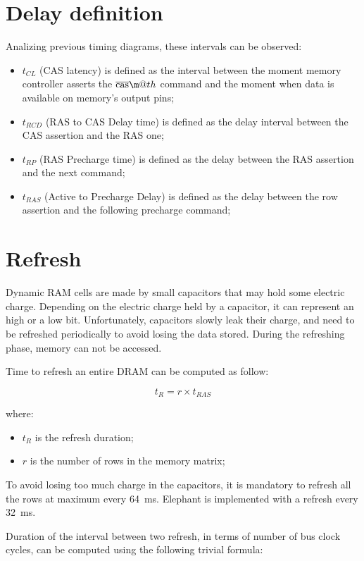 \documentclass[a4paper,12pt]{article}
\makeatletter
\newcommand*{\textoverline}[1]{$\overline{\hbox{#1}}\m@th$}
\newcommand{\memoryname}{Elephant}
\makeatother
\begin{document}
\section{Delay definition}
Analizing previous timing diagrams, these intervals can be observed:
\begin{itemize}
  \item $t_{CL}$ (CAS latency) is defined as the interval between the moment memory controller asserts the \emph{\textoverline{cas}} command and the moment when data is available on memory's output pins;
  \item $t_{RCD}$ (RAS to CAS Delay time) is defined as the delay interval between the CAS assertion and the RAS one;
  \item $t_{RP}$ (RAS Precharge time) is defined as the delay between the RAS assertion and the next command;
  \item $t_{RAS}$ (Active to Precharge Delay) is defined as the delay between the row assertion and the following precharge command;
\end{itemize}

\section{Refresh}
Dynamic RAM cells are made by small capacitors that may hold some electric charge.
Depending on the electric charge held by a capacitor, it can represent an high or a low bit.
Unfortunately, capacitors slowly leak their charge, and need to be refreshed periodically to avoid losing the data stored.
During the refreshing phase, memory can not be accessed.

Time to refresh an entire DRAM can be computed as follow:

$$ t_{R} = r \times t_{RAS} $$

where:

\begin{itemize}
  \item $t_{R}$ is the refresh duration;
  \item $r$ is the number of rows in the memory matrix;
\end{itemize}

To avoid losing too much charge in the capacitors, it is mandatory to refresh all the rows at maximum every 64~ms.
\memoryname{} is implemented with a refresh every 32~ms.

Duration of the interval between two refresh, in terms of number of bus clock cycles, can be computed using the following trivial formula:
\end{document}
